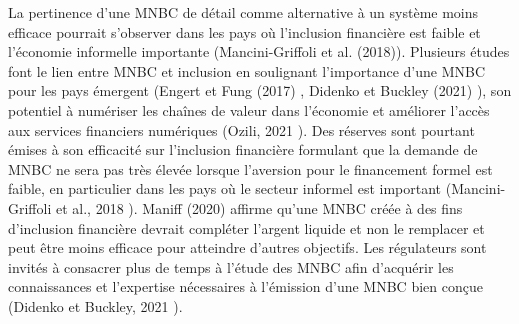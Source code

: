 \documentclass[12pt]{article}
\begin{document}
La pertinence d'une MNBC de détail comme alternative à un système moins efficace pourrait s'observer dans les pays où l'inclusion financière est faible et l'économie informelle importante (Mancini-Griffoli et al. (2018)). Plusieurs études font le lien entre MNBC et  inclusion en soulignant  l'importance d'une MNBC pour les pays émergent (Engert et Fung (2017) \cite{RePEc:bca:bocadp:17-16}, Didenko et Buckley (2021)  \cite{RePEc:aza:jpss00:y:2021:v:15:i:1:p:7-22}), son potentiel à numériser les chaînes de valeur dans l'économie et améliorer l'accès aux services financiers numériques (Ozili, 2021 \cite{Ozili2021Central}). Des réserves sont pourtant émises à son efficacité sur l'inclusion financière formulant que la demande de MNBC ne sera pas très élevée lorsque l'aversion pour le financement formel est faible, en particulier dans les pays où le secteur informel est important (Mancini-Griffoli et al., 2018 \cite{griffoli_casting_2018}). Maniff (2020) affirme qu'une MNBC créée à des fins d'inclusion financière devrait compléter l'argent liquide et non le remplacer et peut être moins efficace pour atteindre d'autres objectifs. Les régulateurs sont invités à consacrer plus de temps à l'étude des MNBC afin d'acquérir les connaissances et l'expertise nécessaires à l'émission d'une MNBC bien conçue (Didenko et Buckley, 2021 \cite{Ozili2021Central}). \\
\end{document}
